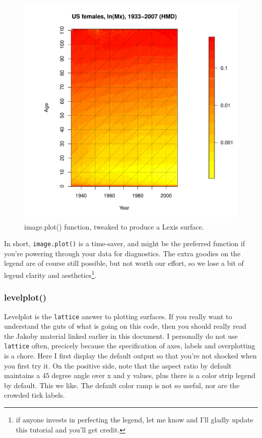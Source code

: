 \documentclass[a4paper]{article}
\begin{document}
\begin{figure}
\centering
\includegraphics[width=4.5in,height=4.5in]{figs/imageplotgood.pdf}
\caption{image.plot() function, tweaked to produce a Lexis surface.}
\end{figure}

In short, \texttt{image.plot()} is a time-saver, and might be the preferred function if you're powering through your data for diagnostics. The extra goodies on the legend are of course still possible, but not worth our effort, so we lose a bit of legend clarity and aesthetics\footnote{if anyone invests in perfecting the legend, let me know and I'll gladly update this tutorial and you'll get credit.}.

\subsubsection{levelplot()}
Levelplot is the \texttt{lattice} answer to plotting surfaces. If you really want to understand the guts of what is going on this code, then you should really read the Jakoby material linked earlier in this document. I personally do not use \texttt{lattice} often, precicely because the specification of axes, labels and overplotting is a chore. Here I first display the default output so that you're not shocked when you first try it. On the positive side, note that the aspect ratio by default maintains a 45 degree angle over x and y values, plus there is a color strip legend by default. This we like. The default color ramp is not so useful, nor are the crowded tick labels.
\end{document}
